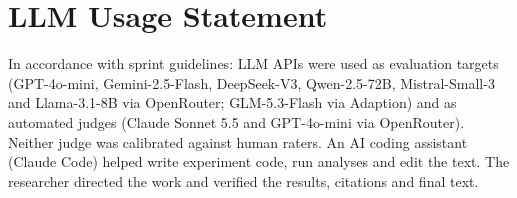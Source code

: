 \documentclass[10pt,a4paper]{article}
\begin{document}
\section{LLM Usage Statement}
In accordance with sprint guidelines: LLM APIs were used as evaluation targets (GPT-4o-mini, Gemini-2.5-Flash, DeepSeek-V3, Qwen-2.5-72B, Mistral-Small-3 and Llama-3.1-8B via OpenRouter; GLM-5.3-Flash via Adaption) and as automated judges (Claude Sonnet 5.5 and GPT-4o-mini via OpenRouter). Neither judge was calibrated against human raters. An AI coding assistant (Claude Code) helped write experiment code, run analyses and edit the text. The researcher directed the work and verified the results, citations and final text.
\end{document}
